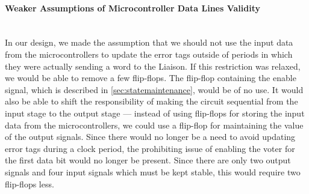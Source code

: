 \paragraph{Weaker Assumptions of Microcontroller Data Lines Validity} \hfill \\
In our design, we made the assumption that we should not use the input
data from the microcontrollers to update the error tags outside of
periods in which they were actually sending a word to the Liaison. If
this restriction was relaxed, we would be able to remove a few
flip-flops. The flip-flop containing the enable signal, which is described
in \autoref{sec:statemaintenance},
would be of no use. It would also be able to shift the responsibility
of making the circuit sequential from the input stage to the output
stage --- instead of using flip-flops for storing the input data from
the microcontrollers, we could use a flip-flop for maintaining the
value of the output signals. Since there would no longer be a need to
avoid updating error tags during a clock period, the prohibiting issue
of enabling the voter for the first data bit would no longer be
present. Since there are only two output signals and four input
signals which must be kept stable, this would require two flip-flops
less.
